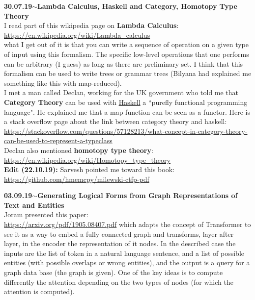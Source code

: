 \documentclass[11pt,a4paper]{article}
\newenvironment{loggentry}[2]%
{\noindent\textbf{#1}\hspace{1cm}$\mathbf{\sim}$\text{ }\textbf{#2}\\}{\vspace{0.5cm}}
\begin{document}
\begin{loggentry}{30.07.19}{Lambda Calculus, Haskell and Category, Homotopy Type Theory}

I read part of this wikipedia page on \textbf{Lambda Calculus}:\\
\url{https://en.wikipedia.org/wiki/Lambda_calculus}\\
what I get out of it is that you can write a sequence of operation on a given type of input using this formalism. The specific low-level operations that one performs can be arbitrary (I guess) as long as there are preliminary set. I think that this formalism can be used to write trees or grammar trees (Bilyana had explained me something like this with map-reduced).\\

I met a man called Declan, working for the UK government who told me that \textbf{Category Theory} can be used with \href{https://en.wikipedia.org/wiki/Haskell_%28programming_language%29}{Haskell} a ``purefly functional programming language". He explained me that a map function can be seen as a functor. Here is a stack overflow page about the link between category theory and haskell:\\
\url{https://stackoverflow.com/questions/57128213/what-concept-in-category-theory-can-be-used-to-represent-a-typeclass}\\
Declan also mentioned \textbf{homotopy type theory}:\\
\url{https://en.wikipedia.org/wiki/Homotopy_type_theory}\\
\textbf{Edit (22.10.19):} Sarvesh pointed me toward this book:\\
\url{https://github.com/hmemcpy/milewski-ctfp-pdf}\\

\end{loggentry}


\begin{loggentry}{03.09.19}{Generating Logical Forms from Graph Representations of Text and Entities}

Joram presented this paper:\\
\url{https://arxiv.org/pdf/1905.08407.pdf}
which adapts the concept of Transformer to see it as a way to embed a fully connected graph and transforms, layer after layer, in the encoder the representation of it nodes. In the described case the inputs are the list of token in a natural language sentence, and a list of possible entities (with possible overlaps or wrong entities), and the output is a query for a graph data base (the graph is given). One of the key ideas is to compute differently the attention depending on the two types of nodes (for which the attention is computed).

\end{loggentry}
\end{document}
